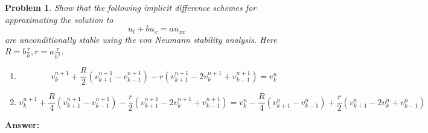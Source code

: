 \documentclass[a4paper,12pt]{article}
\newtheorem{prob}{Problem}[]
\begin{document}
\newpage
\begin{prob}
	Show that the following implicit difference schemes for approximating the solution to
	\begin{equation}
	u_t + bu_x = au_{xx}
	\end{equation}
	are unconditionally stable using the von Neumann stability analysis. Here $R = b\frac{\tau}{h},r=a\frac{\tau}{h^2}$.
	\begin{enumerate}
		\item \begin{equation}\label{eq:15}
		v_{k}^{n+1} + \frac{R}{2}(v_{k+1}^{n+1}-v_{k-1}^{n+1}) - r(v_{k+1}^{n+1}-2v_{k}^{n+1} + v_{k-1}^{n+1}) = v_{k}^{n}
		\end{equation}
		\item \begin{equation}\label{eq:16}
		v_{k}^{n+1} + \frac{R}{4}(v_{k+1}^{n+1}-v_{k-1}^{n+1}) - \frac{r}{2}(v_{k+1}^{n+1}-2v_{k}^{n+1} + v_{k-1}^{n+1}) = v_{k}^{n} - \frac{R}{4}(v_{k+1}^{n}-v_{k-1}^{n}) + \frac{r}{2}(v_{k+1}^{n}-2v_{k}^{n} + v_{k-1}^{n})
		\end{equation}
	\end{enumerate}
\end{prob}
\textbf{Answer:}
\end{document}

